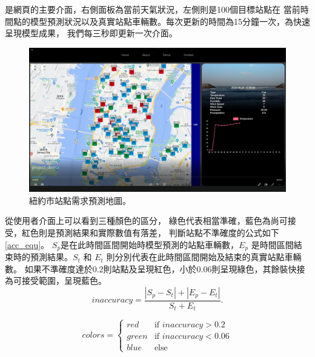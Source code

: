 \documentclass[a4paper,14pt]{extarticle}
\begin{document}
             是網頁的主要介面，右側面板為當前天氣狀況，左側則是100個目標站點在
            當前時間點的模型預測狀況以及真實站點車輛數。每次更新的時間為15分鐘一次，為快速呈現模型成果，
            我們每三秒即更新一次介面。
            \begin{figure}[htb]
                \centering
                \includegraphics[width=\textwidth]{web-view.png}
                \caption{
                    {\fontsize{12pt}{10pt}\selectfont
                        紐約市站點需求預測地圖。
                    }
                }
                \label{fig:web-view}
            \end{figure}
            從使用者介面上可以看到三種顏色的區分，
            綠色代表相當準確，藍色為尚可接受，紅色則是預測結果和實際數值有落差，
            判斷站點不準確度的公式如下 \ref{acc_equ}。 $S_p$是在此時間區間開始時模型預測的站點車輛數，$E_p$ 
            是時間區間結束時的預測結果。$S_t$ 和 $E_t$ 則分別代表在此時間區間開始及結束的真實站點車輛數。
            如果不準確度達於0.2則站點及呈現紅色，小於0.06則呈現綠色，其餘裝快接為可接受範圍，呈現藍色。
            \begin{equation}
            \label{acc_equ}
            \text{$inaccuracy$} = \frac{|S_p-S_t|+|E_p-E_t|}{S_t+E_t}.
            \end{equation}

            \[
            colors =
            \begin{cases}
            red & \text{if $inaccuracy>0.2$} \\
            green & \text{if $inaccuracy<0.06$} \\
            blue & \text{else} 
            \end{cases}
            \]
\end{document}
